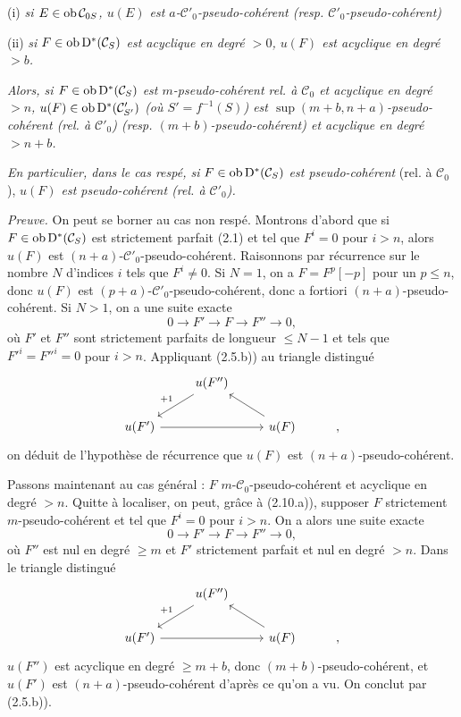 \documentclass[11pt]{article}
\begin{document}
(i) \emph{si \(E\in\operatorname{ob}\mathcal C_{0S}\), \(u(E)\) est \(a\)-\(\mathcal C'_0\)-pseudo-cohérent (resp. \(\mathcal C'_0\)-pseudo-cohérent)}

(ii) \emph{si \(F\in\operatorname{ob}\mathrm D^*(\mathcal C_S)\) est acyclique en degré \(>0\), \(u(F)\) est acyclique en degré \(>b\).}

\emph{Alors, si \(F\in\operatorname{ob}\mathrm D^*(\mathcal C_S)\) est \(m\)-pseudo-cohérent rel. à \(\mathcal C_0\) et acyclique en degré \(>n\), \(u(F)\in\operatorname{ob}\mathrm D^*(\mathcal C'_{S'})\) (où \(S'=f^{-1}(S)\)) est \(\sup(m+b,n+a)\)-pseudo-cohérent (rel. à \(\mathcal C'_0\)) (resp. \((m+b)\)-pseudo-cohérent) et acyclique en degré \(>n+b\).}

\emph{En particulier, dans le cas respé, si \(F\in\operatorname{ob}\mathrm D^*(\mathcal C_S)\) est pseudo-cohérent} (rel. à \(\mathcal C_0\)), \emph{\(u(F)\) est pseudo-cohérent (rel. à \(\mathcal C'_0\)).}

\emph{Preuve.} On peut se borner au cas non respé. Montrons d'abord que si \(F\in\operatorname{ob}\mathrm D^*(\mathcal C_S)\) est strictement parfait (2.1) et tel que \(F^i=0\) pour \(i>n\), alors \(u(F)\) est \((n+a)\)-\(\mathcal C'_0\)-pseudo-cohérent. Raisonnons par récurrence sur le nombre \(N\) d'indices \(i\) tels que \(F^i\neq0\). Si \(N=1\), 
on a \(F=F^p[-p]\)
pour un \(p\leq n\), donc \(u(F)\) est \((p+a)\)-\(\mathcal C'_0\)-pseudo-cohérent, donc a fortiori \((n+a)\)-pseudo-cohérent. Si \(N>1\), on a une suite exacte
\[
  0\longrightarrow F'\longrightarrow F\longrightarrow F''\longrightarrow 0,
\]
où \(F'\) et \(F''\) sont strictement parfaits de longueur \(\leq N-1\) et tels que \(F'^i=F''^i=0\) pour \(i>n\). Appliquant (2.5.b)) au triangle distingué
\[
\begin{tikzcd}
& u(F'') \arrow[dl,"+1"'] & \\
u(F') \arrow[rr] && u(F) \arrow[ul] & ,
\end{tikzcd}
\]
on déduit de l'hypothèse de récurrence que \(u(F)\) est \((n+a)\)-pseudo-cohérent.

Passons maintenant au cas général : \(F\) \(m\)-\(\mathcal C_0\)-pseudo-cohérent et acyclique en degré \(>n\). Quitte à localiser, on peut, grâce à (2.10.a)), supposer \(F\) strictement \(m\)-pseudo-cohérent et tel que \(F^i=0\) pour \(i>n\). On a alors une suite exacte
\[
  0\longrightarrow F'\longrightarrow F\longrightarrow F''\longrightarrow 0,
\]
où \(F''\) est nul en degré \(\geq m\) et \(F'\) strictement parfait et nul en degré \(>n\). Dans le triangle distingué
\[
\begin{tikzcd}
& u(F'') \arrow[dl,"+1"'] & \\
u(F') \arrow[rr] && u(F) \arrow[ul] & ,
\end{tikzcd}
\]
\(u(F'')\) est acyclique en degré \(\geq m+b\), donc \((m+b)\)-pseudo-cohérent, et \(u(F')\) est \((n+a)\)-pseudo-cohérent d'après ce qu'on a vu. On conclut par (2.5.b)).
\end{document}
